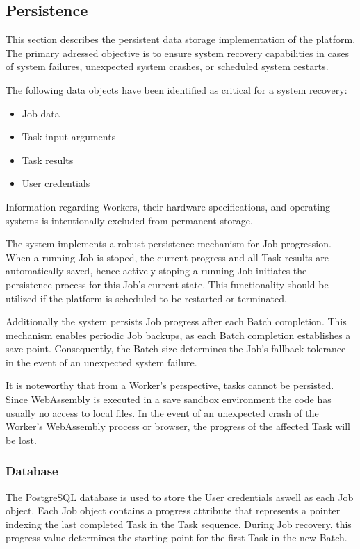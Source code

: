 \subsection{Persistence}
\label{subsec:implementation:architecture:persistence}
This section describes the persistent data storage implementation of the platform. The primary adressed objective is to ensure system recovery capabilities in cases of system failures, unexpected system crashes, or scheduled system restarts.

The following data objects have been identified as critical for a system recovery:
\begin{itemize}
    \item Job data
    \item Task input arguments
    \item Task results
    \item User credentials
\end{itemize}
Information regarding Workers, their hardware specifications, and operating systems is intentionally excluded from permanent storage.

The system implements a robust persistence mechanism for Job progression. When a running Job is stoped, the current progress and all Task results are automatically saved, hence actively stoping a running Job initiates the persistence process for this Job's current state. This functionality should be utilized if the platform is scheduled to be restarted or terminated.

Additionally the system persists Job progress after each Batch completion. This mechanism enables periodic Job backups, as each Batch completion establishes a save point. Consequently, the Batch size determines the Job's fallback tolerance in the event of an unexpected system failure.

It is noteworthy that from a Worker's perspective, tasks cannot be persisted. Since WebAssembly is executed in a save sandbox environment the code has usually no access to local files. In the event of an unexpected crash of the Worker's WebAssembly process or browser, the progress of the affected Task will be lost.

\subsubsection{Database}
The PostgreSQL database is used to store the User credentials aswell as each Job object. Each Job object contains a progress attribute that represents a pointer indexing the last completed Task in the Task sequence. During Job recovery, this progress value determines the starting point for the first Task in the new Batch.

